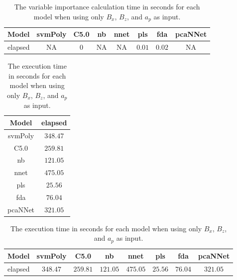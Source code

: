 \begin{table}[!ht]
	\centering
	\begin{tabular}{|c|c|c|c|c|c|c|c|}
		\hline
		Model & svmPoly & C5.0 & nb & nnet & pls & fda & pcaNNet \\ \hline
		elapsed & NA & $0$ & NA & NA & $0.01$ & $0.02$ & NA \\ \hline
	\end{tabular}
	\caption{The variable importance calculation time in seconds for each model when using only $B_{x}$, $B_{z}$, and $a_{p}$ as input.}
	\label{tab:time:reverse:xzap:importance}
\end{table}

\begin{table}[!ht]
	\centering
	\begin{tabular}{|c|c|}
		\hline
		Model & elapsed \\ \hline
		svmPoly & $348.47$ \\ \hline
		C5.0 & $259.81$ \\ \hline
		nb & $121.05$ \\ \hline
		nnet & $475.05$ \\ \hline
		pls & $25.56$ \\ \hline
		fda & $76.04$ \\ \hline
		pcaNNet & $321.05$ \\ \hline
	\end{tabular}
	\caption{The execution time in seconds for each model when using only $B_{x}$, $B_{z}$, and $a_{p}$ as input.}
	\label{tab:time:xzap:total}
\end{table}

\begin{table}[!ht]
	\centering
	\begin{tabular}{|c|c|c|c|c|c|c|c|}
		\hline
		Model & svmPoly & C5.0 & nb & nnet & pls & fda & pcaNNet \\ \hline
		elapsed & $348.47$ & $259.81$ & $121.05$ & $475.05$ & $25.56$ & $76.04$ & $321.05$ \\ \hline
	\end{tabular}
	\caption{The execution time in seconds for each model when using only $B_{x}$, $B_{z}$, and $a_{p}$ as input.}
	\label{tab:time:reverse:xzap:total}
\end{table}

